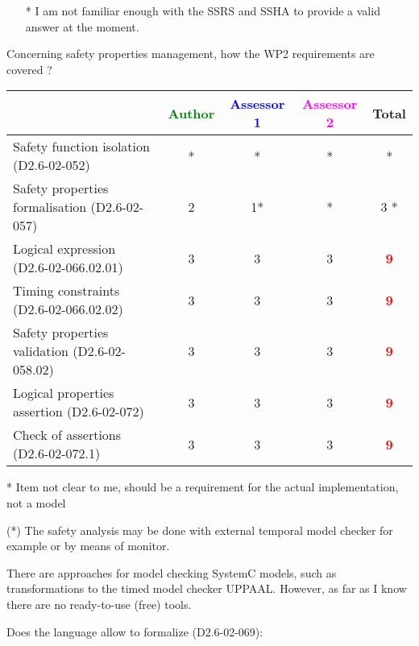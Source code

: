 \begin{assessor2}
  \begin{itemize}
  \item[*] I am not familiar enough with the SSRS and SSHA to provide a
    valid answer at the moment.
  \end{itemize}  
\end{assessor2}


Concerning safety properties management, how the WP2 requirements are covered ?

\begin{tabular}{|l | c | c | c | c|}
\hline
& \textcolor{green}{Author} & \textcolor{blue}{Assessor 1} & \textcolor{magenta}{Assessor 2} & Total \\
\hline
Safety function isolation (D2.6-02-052) &* & * & * & * \\
\hline
Safety properties formalisation (D2.6-02-057) &2 &1* & * & 3   * \\
\hline
Logical expression (D2.6-02-066.02.01) &3 &3 &3 & \textcolor{red}{\textbf{9}}  \\
\hline
Timing constraints (D2.6-02-066.02.02) &3 &3 &3 & \textcolor{red}{\textbf{9}} \\
\hline
Safety properties validation (D2.6-02-058.02) &3 &3 &3 & \textcolor{red}{\textbf{9}} \\
\hline
Logical properties assertion (D2.6-02-072) &3 &3 &3 & \textcolor{red}{\textbf{9}} \\
\hline
Check of assertions (D2.6-02-072.1) &3 &3 &3 & \textcolor{red}{\textbf{9}} \\
\hline
\end{tabular}


\begin{author_comment}
* Item not clear to me, should be a requirement for the actual implementation, not a model
\end{author_comment}

\begin{assessor1}
(*) The safety analysis may be done with external temporal model
checker for example or by means of monitor. 
\begin{author_comment}
There are approaches for model checking SystemC models, such as transformations to the timed model checker UPPAAL. However, as far as I know there are no ready-to-use (free) tools.
\end{author_comment}
\end{assessor1}
Does the language allow to formalize (D2.6-02-069):

